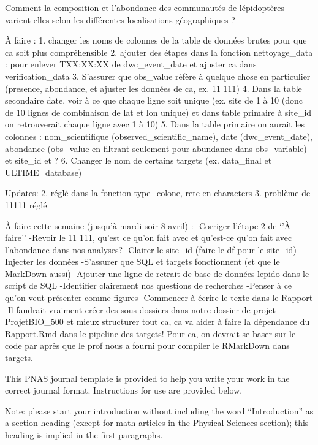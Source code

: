 \documentclass[9pt,twocolumn,twoside,]{pnas-new}
\begin{document}
Comment la composition et l'abondance des communautés de lépidoptères
varient-elles selon les différentes localisations géographiques ?

À faire : 1. changer les noms de colonnes de la table de données brutes
pour que ca soit plus compréhensible 2. ajouter des étapes dans la
fonction nettoyage\_data : pour enlever TXX:XX:XX de dwc\_event\_date et
ajuster ca dans verification\_data 3. S'assurer que obs\_value réfère à
quelque chose en particulier (presence, abondance, et ajuster les
données de ca, ex. 11 111) 4. Dans la table secondaire date, voir à ce
que chaque ligne soit unique (ex. site de 1 à 10 (donc de 10 lignes de
combinaison de lat et lon unique) et dans table primaire à site\_id on
retrouverait chaque ligne avec 1 à 10) 5. Dans la table primaire on
aurait les colonnes : nom\_scientifique (observed\_scientific\_name),
date (dwc\_event\_date), abondance (obs\_value en filtrant seulement
pour abundance dans obs\_variable) et site\_id et ? 6. Changer le nom de
certains targets (ex. data\_final et ULTIME\_database)

Updates: 2. réglé dans la fonction type\_colone, rete en characters 3.
problème de 11111 réglé

À faire cette semaine (jusqu'à mardi soir 8 avril) : -Corriger l'étape 2
de `'À faire'' -Revoir le 11 111, qu'est ce qu'on fait avec et qu'est-ce
qu'on fait avec l'abondance dans nos analyses? -Clairer le site\_id
(faire le df pour le site\_id) -Injecter les données -S'assurer que SQL
et targets fonctionnent (et que le MarkDown aussi) -Ajouter une ligne de
retrait de base de données lepido dans le script de SQL -Identifier
clairement nos questions de recherches -Penser à ce qu'on veut présenter
comme figures -Commencer à écrire le texte dans le Rapport -Il faudrait
vraiment créer des sous-dossiers dans notre dossier de projet
ProjetBIO\_500 et mieux structurer tout ca, ca va aider à faire la
dépendance du Rapport.Rmd dans le pipeline des targets! Pour ca, on
devrait se baser sur le code par après que le prof nous a fourni pour
compiler le RMarkDown dans targets.

This PNAS journal template is provided to help you write your work in
the correct journal format. Instructions for use are provided below.

Note: please start your introduction without including the word
``Introduction'' as a section heading (except for math articles in the
Physical Sciences section); this heading is implied in the first
paragraphs.
\end{document}
